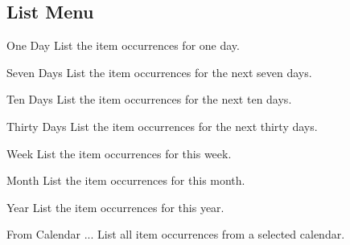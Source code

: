 \documentclass[a4paper,english]{article}
\begin{document}
    \subsection{ List Menu}
        \begin{Description}\setlength{\itemsep}{0cm}
        \item[One Day]
            List the item occurrences for one day.

        \item[Seven Days]
            List the item occurrences for the next seven days.

        \item[Ten Days]
            List the item occurrences for the next ten days.

        \item[Thirty Days]
            List the item occurrences for the next thirty days.

        \item[Week]
           List the item occurrences for this week.

        \item[Month]
            List the item occurrences for this month.

        \item[Year]
            List the item occurrences for this year.

        \item[From Calendar ...]
            List all item occurrences from a selected calendar.

        \end{Description}
\end{document}
